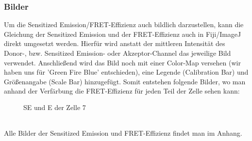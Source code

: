 \subsubsection{Bilder}
Um die Sensitized Emission/FRET-Effizienz auch bildlich darzustellen, kann die Gleichung der Sensitized Emission und der FRET-Effizienz auch in Fiji/ImageJ direkt umgesetzt werden.
Hierfür wird anstatt der mittleren Intensität des Donor-, bzw. Sensitized Emission- oder Akzeptor-Channel das jeweilige Bild verwendet.
Anschließend wird das Bild noch mit einer Color-Map versehen (wir haben uns für 'Green Fire Blue' entschieden), eine Legende (Calibration Bar) und Größenangabe (Scale Bar) hinzugefügt.
Somit entstehen folgende Bilder, wo man anhand der Verfärbung die FRET-Effizienz für jeden Teil der Zelle sehen kann:
\begin{figure}[h]
    \centering{}
    \caption{SE und E der Zelle 7}
\end{figure}\\
Alle Bilder der Sensitized Emission und FRET-Effizienz findet man im Anhang.

